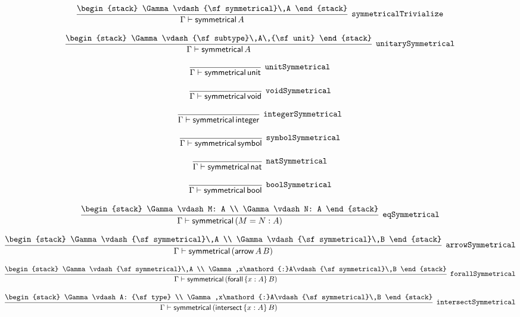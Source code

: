 \[
\infer[{\tt symmetricalTrivialize}]{\Gamma \vdash {\sf symmetrical}\,A}{
\begin{stack}
\Gamma \vdash {\sf symmetrical}\,A
\end{stack}}
\]

\[
\infer[{\tt unitarySymmetrical}]{\Gamma \vdash {\sf symmetrical}\,A}{
\begin{stack}
\Gamma \vdash {\sf subtype}\,A\,{\sf unit}
\end{stack}}
\]

\[
\infer[{\tt unitSymmetrical}]{\Gamma \vdash {\sf symmetrical}\,{\sf unit}}{}
\]

\[
\infer[{\tt voidSymmetrical}]{\Gamma \vdash {\sf symmetrical}\,{\sf void}}{}
\]

\[
\infer[{\tt integerSymmetrical}]{\Gamma \vdash {\sf symmetrical}\,{\sf integer}}{}
\]

\[
\infer[{\tt symbolSymmetrical}]{\Gamma \vdash {\sf symmetrical}\,{\sf symbol}}{}
\]

\[
\infer[{\tt natSymmetrical}]{\Gamma \vdash {\sf symmetrical}\,{\sf nat}}{}
\]

\[
\infer[{\tt boolSymmetrical}]{\Gamma \vdash {\sf symmetrical}\,{\sf bool}}{}
\]

\[
\infer[{\tt eqSymmetrical}]{\Gamma \vdash {\sf symmetrical}\,(M= N: A)}{
\begin{stack}
\Gamma \vdash M: A
\\
\Gamma \vdash N: A
\end{stack}}
\]

\[
\infer[{\tt arrowSymmetrical}]{\Gamma \vdash {\sf symmetrical}\,({\sf arrow}\,A\,B)}{
\begin{stack}
\Gamma \vdash {\sf symmetrical}\,A
\\
\Gamma \vdash {\sf symmetrical}\,B
\end{stack}}
\]

\[
\infer[{\tt forallSymmetrical}]{\Gamma \vdash {\sf symmetrical}\,({\sf forall}\,\{x : A\}\,B)}{
\begin{stack}
\Gamma \vdash {\sf symmetrical}\,A
\\
\Gamma ,x\mathord{:}A\vdash {\sf symmetrical}\,B
\end{stack}}
\]

\[
\infer[{\tt intersectSymmetrical}]{\Gamma \vdash {\sf symmetrical}\,({\sf intersect}\,\{x : A\}\,B)}{
\begin{stack}
\Gamma \vdash A: {\sf type}
\\
\Gamma ,x\mathord{:}A\vdash {\sf symmetrical}\,B
\end{stack}}
\]

